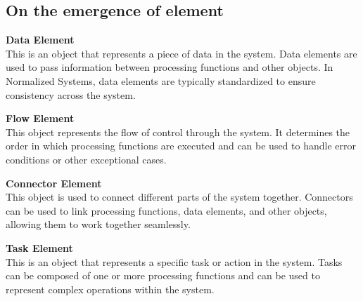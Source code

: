\subsection{On the emergence of element} \label{subsec:ns_elements} 

\textbf{Data Element}\\
This is an object that represents a piece of data in the system. Data elements are used to
pass information between processing functions and other objects. In Normalized Systems,
data elements are typically standardized to ensure consistency across the system.

\textbf{Flow Element}\\
This object represents the flow of control through the system. It determines the order in
which processing functions are executed and can be used to handle error conditions or
other exceptional cases.

\textbf{Connector Element}\\
This object is used to connect different parts of the system together. Connectors can be
used to link processing functions, data elements, and other objects, allowing them to work
together seamlessly.

\textbf{Task Element}\\
This is an object that represents a specific task or action in the system. Tasks can be
composed of one or more processing functions and can be used to represent complex
operations within the system.